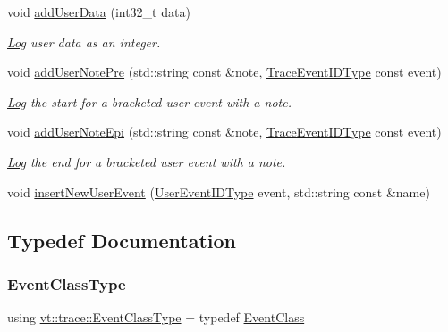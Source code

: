 \begin{DoxyCompactItemize}
void \hyperlink{namespacevt_1_1trace_a0ec1ac44fb179f29245a36b887f588f1}{add\+User\+Data} (int32\+\_\+t data)
\begin{DoxyCompactList}\small\item\em \hyperlink{structvt_1_1trace_1_1_log}{Log} user data as an integer. \end{DoxyCompactList}\item 
void \hyperlink{namespacevt_1_1trace_ac0b0b0a9f767ff83a2b97bb8d013a74f}{add\+User\+Note\+Pre} (std\+::string const \&note, \hyperlink{namespacevt_1_1trace_a64a7185f3e102df8d8258f263ccd1582}{Trace\+Event\+I\+D\+Type} const event)
\begin{DoxyCompactList}\small\item\em \hyperlink{structvt_1_1trace_1_1_log}{Log} the start for a bracketed user event with a note. \end{DoxyCompactList}\item 
void \hyperlink{namespacevt_1_1trace_a44c28c2bd54ed805974c79c8aea5a55e}{add\+User\+Note\+Epi} (std\+::string const \&note, \hyperlink{namespacevt_1_1trace_a64a7185f3e102df8d8258f263ccd1582}{Trace\+Event\+I\+D\+Type} const event)
\begin{DoxyCompactList}\small\item\em \hyperlink{structvt_1_1trace_1_1_log}{Log} the end for a bracketed user event with a note. \end{DoxyCompactList}\item 
void \hyperlink{namespacevt_1_1trace_acbaabde4144cf5291fcc65983e7dc7a0}{insert\+New\+User\+Event} (\hyperlink{namespacevt_1_1trace_a5908920d051c144c89f17c69ed262350}{User\+Event\+I\+D\+Type} event, std\+::string const \&name)
\end{DoxyCompactItemize}


\subsection{Typedef Documentation}
\mbox{\label{namespacevt_1_1trace_afc5456ac95b0d3e9bb63a21597f5660c}} 
\subsubsection{\texorpdfstring{Event\+Class\+Type}{EventClassType}}
{\footnotesize\ttfamily using \hyperlink{namespacevt_1_1trace_afc5456ac95b0d3e9bb63a21597f5660c}{vt\+::trace\+::\+Event\+Class\+Type} = typedef \hyperlink{structvt_1_1trace_1_1_event_class}{Event\+Class}}

